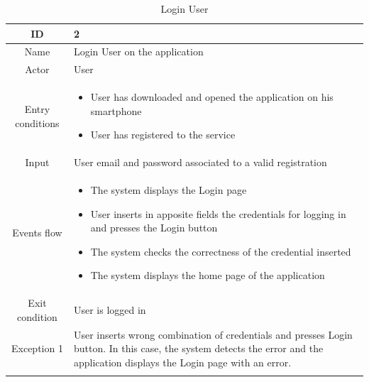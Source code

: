 \documentclass[table, 12pt]{article}
\begin{document}
\begin{longtable}{|c| p{10cm}|}
    \hline ID        & 2                                                                                                                                                                             \\
    \hline
    Name             & Login User on the application                                                                                                                                                 \\
    \hline
    Actor            & User                                                                                                                                                                          \\
    \hline
    Entry conditions & \begin{itemize}[nosep,after=\strut]
        \item User has downloaded and opened the application on his smartphone
        \item User has registered to the service
    \end{itemize}                                                                                                                                                    \\ \hline
    Input            & User email and password associated to a valid registration                                                                                                                    \\
    \hline
    Events flow      & \begin{itemize}[nosep,after=\strut]
        \item The system displays the Login page
        \item User inserts in apposite fields the credentials for logging in and presses the Login button
        \item The system checks the correctness of the credential inserted
        \item The system displays the home page of the application
    \end{itemize}                                                                                                                                                    \\
    \hline
    Exit condition   & User is logged in                                                                                                                                                             \\
    \hline
    \hline
    Exception 1      & User inserts wrong combination of credentials and presses Login button. In this case, the system detects the error and the application displays the Login page with an error. \\
    \hline
    \caption{Login User}                                                                                                                                                                             \\
\end{longtable}
\end{document}
